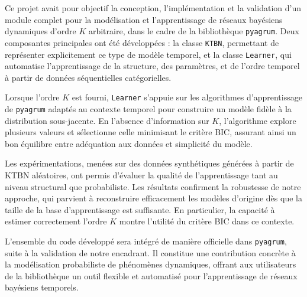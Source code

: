 \documentclass{article}
\begin{document}
Ce projet avait pour objectif la conception, l'implémentation et la validation
d'un module complet pour la modélisation et l'apprentissage de réseaux bayésiens
dynamiques d'ordre $K$ arbitraire, dans le cadre de la bibliothèque \texttt{pyagrum}.
Deux composantes principales ont été développées : la classe \texttt{KTBN},
permettant de représenter explicitement ce type de modèle temporel, et la classe
\texttt{Learner}, qui automatise l'apprentissage de la structure, des paramètres,
et de l'ordre temporel à partir de données séquentielles catégorielles.

Lorsque l'ordre $K$ est fourni, \texttt{Learner} s'appuie sur les algorithmes
d'apprentissage de \texttt{pyagrum} adaptés au contexte temporel pour construire
un modèle fidèle à la distribution sous-jacente. En l'absence d'information sur $K$,
l'algorithme explore plusieurs valeurs et sélectionne celle minimisant le critère BIC,
assurant ainsi un bon équilibre entre adéquation aux données et simplicité du modèle.

Les expérimentations, menées sur des données synthétiques générées à partir de KTBN
aléatoires, ont permis d'évaluer la qualité de l'apprentissage tant au niveau
structural que probabiliste. Les résultats confirment la robustesse de notre approche,
qui parvient à reconstruire efficacement les modèles d'origine dès que la taille de
la base d'apprentissage est suffisante. En particulier, la capacité à estimer
correctement l'ordre $K$ montre l'utilité du critère BIC dans ce contexte.

L'ensemble du code développé sera intégré de manière officielle dans \texttt{pyagrum},
suite à la validation de notre encadrant. Il constitue une contribution concrète à
la modélisation probabiliste de phénomènes dynamiques, offrant aux utilisateurs de
la bibliothèque un outil flexible et automatisé pour l'apprentissage de réseaux
bayésiens temporels.



\end{document}
